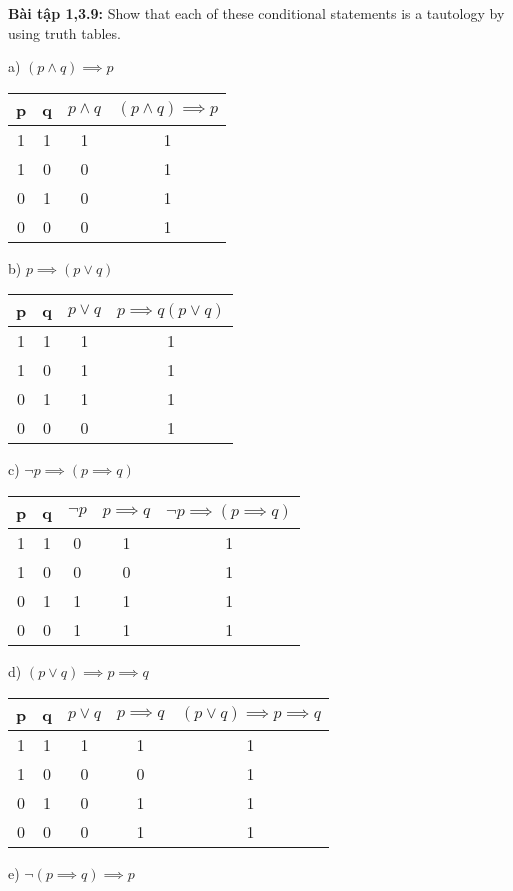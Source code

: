 \documentclass[a4paper]{article}
\begin{document}
\textbf{Bài tập 1,3.9:} Show that each of these conditional statements is a tautology by using truth tables.
\begin{enumerate}
	\begin{table} [h]
		\item[a)] $(p \land q) \implies p$
		\centering
		\begin{tabular} {|c|c|c|c|}
			\hline
			p&q&$p \land q$&$(p \land q) \implies p$\\
			\hline
			1&1&1&1\\
			1&0&0&1\\
			0&1&0&1\\
			0&0&0&1\\
			\hline
		\end{tabular}
		\item[b)] $p \implies (p \lor q)$
		\centering
		\begin{tabular} {|c|c|c|c|}
			\hline
			p&q&$p \lor q$&$p \implies q(p \lor q)$\\
			\hline
			1&1&1&1\\
			1&0&1&1\\
			0&1&1&1\\
			0&0&0&1\\
			\hline
		\end{tabular}
		\item[c)] $\lnot p \implies (p \implies q)$
		\centering
		\begin{tabular} {|c|c|c|c|c|}
			\hline
			p&q&$\lnot p$&$p \implies q$&$\lnot p \implies (p \implies q)$\\
			\hline
			1&1&0&1&1\\
			1&0&0&0&1\\
			0&1&1&1&1\\
			0&0&1&1&1\\
			\hline
		\end{tabular}
		\item[d)] $(p \lor q) \implies p \implies q$
		\centering
		\begin{tabular} {|c|c|c|c|c|}
			\hline
			p&q&$p \lor q$&$p \implies q$&$(p \lor q) \implies p \implies q$\\
			\hline
			1&1&1&1&1\\
			1&0&0&0&1\\
			0&1&0&1&1\\
			0&0&0&1&1\\
			\hline
		\end{tabular}
		\item[e)] $\lnot (p \implies q) \implies p$
		\centering
		\begin{tabular} {|c|c|c|c|c|}

\end{tabular}
\end{table}
\end{enumerate}
\end{document}
